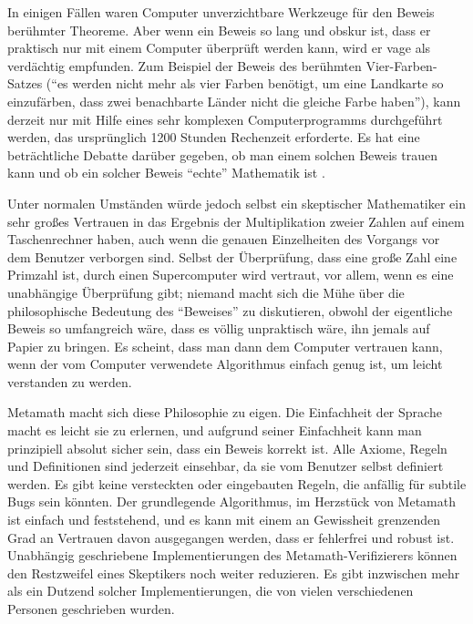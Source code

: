 In einigen Fällen waren Computer unverzichtbare Werkzeuge für den Beweis berühmter Theoreme.  Aber wenn ein Beweis so lang und obskur ist, dass er praktisch nur mit einem Computer überprüft werden kann, wird er vage als verdächtig empfunden.
Zum Beispiel der Beweis des berühmten Vier-Farben-Satzes ("`es werden nicht mehr als vier Farben benötigt, um eine Landkarte so einzufärben, dass zwei benachbarte Länder nicht die gleiche Farbe haben"'), kann derzeit nur mit Hilfe eines sehr komplexen Computerprogramms durchgeführt werden, das ursprünglich 1200 Stunden Rechenzeit erforderte. Es hat eine beträchtliche Debatte darüber gegeben, ob man einem solchen Beweis trauen kann und ob ein solcher Beweis "`echte"' Mathematik ist \cite{Swart}.

Unter normalen Umständen würde jedoch selbst ein skeptischer Mathematiker ein sehr großes Vertrauen in das Ergebnis der Multiplikation zweier Zahlen auf einem Taschenrechner haben, auch wenn die genauen Einzelheiten des Vorgangs vor dem Benutzer verborgen sind.
Selbst der Überprüfung, dass eine große Zahl eine Primzahl ist, durch einen Supercomputer wird vertraut, vor allem, wenn es eine unabhängige Überprüfung gibt; niemand macht sich die Mühe über die philosophische Bedeutung des "`Beweises"' zu diskutieren, obwohl der eigentliche Beweis so umfangreich wäre, dass es völlig unpraktisch wäre, ihn jemals auf Papier zu bringen.  Es scheint, dass man dann dem Computer vertrauen kann, wenn der vom Computer verwendete Algorithmus einfach genug ist, um leicht verstanden zu werden.

Metamath macht sich diese Philosophie zu eigen.  Die Einfachheit der Sprache macht es leicht sie zu erlernen, und aufgrund seiner Einfachheit kann man prinzipiell absolut sicher sein, dass ein Beweis korrekt ist. Alle Axiome, Regeln und Definitionen sind jederzeit einsehbar, da sie vom Benutzer selbst definiert werden.
Es gibt keine versteckten oder eingebauten Regeln, die anfällig für subtile Bugs sein könnten.
Der grundlegende Algorithmus, im Herzstück von Metamath ist einfach und feststehend, und es kann mit einem an Gewissheit grenzenden Grad an Vertrauen davon ausgegangen werden, dass er fehlerfrei und robust ist.
Unabhängig geschriebene Implementierungen des Metamath-Verifizierers können den Restzweifel eines Skeptikers noch weiter reduzieren.
Es gibt inzwischen mehr als ein Dutzend solcher Implementierungen, die von vielen verschiedenen Personen geschrieben wurden.

